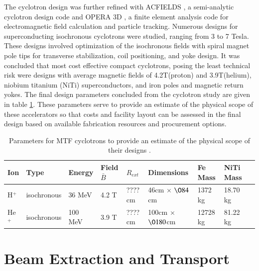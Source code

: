 \documentclass[final,3p,times,twocolumn]{elsarticle} %
\begin{document}
The cyclotron design was further refined with ACFIELDS \cite{block2011}, a semi-analytic cyclotron design code and OPERA 3D \cite{fields2004opera}, a finite element analysis code for electromagnetic field calculation and particle tracking.  Numerous designs for superconducting isochronous cyclotrons were studied, ranging from 3 to 7 Tesla.  These designs involved optimization of the isochronous fields with spiral magnet pole tips for transverse stabilization, coil positioning, and yoke design.  It was concluded that most cost effective compact cyclotrons, posing the least technical risk were designs with average magnetic fields of 4.2T(proton) and 3.9T(helium), niobium titanium (NiTi) superconductors, and iron poles and magnetic return yokes.  The final design parameters concluded from the cyclotron study \cite{sordelet2011design} are given in table \ref{tab:CyclotronParameters}.  These parameters serve to provide an estimate of the physical scope of these accelerators so that costs and facility layout can be assessed in the final design based on available fabrication resources and procurement options.

\begin{table}
  \begin{tabular}{|l|l|l|l|l|l|l|l|l|} 
    \hline Ion & Type & Energy & Field $\bar{B}$ & $R_{ext}$ & Dimensions & Fe Mass & NiTi Mass \\ 
    \hline
    \hline H$^+$ & isochronous & 36 MeV & 4.2 T & ???? cm & 46cm $\times$ $\O 84$cm & 1372 kg & 18.70 kg   \\
    \hline He$^+$ & isochronous & 100 MeV & 3.9 T & ???? cm & 100cm $\times$ $\O 180$cm & 12728 kg & 81.22 kg  \\
	\hline
  \end{tabular}
\caption{Parameters for MTF cyclotrons to provide an estimate of the physical scope of their designs \cite{sordelet2011design}.}
\label{tab:CyclotronParameters}
\end{table}


\section{Beam Extraction and Transport}
\end{document}
